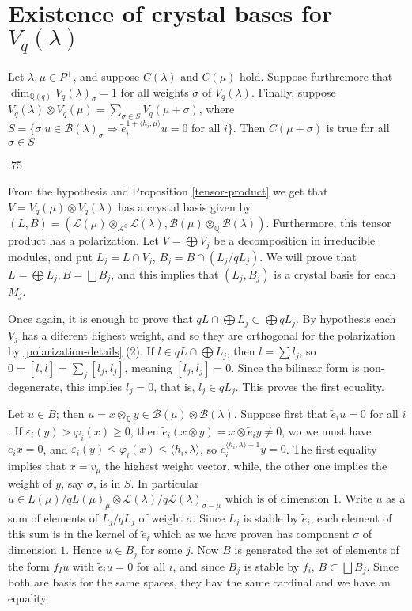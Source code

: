 \documentclass[11pt,fleqn]{article}
\makeatletter
\renewenvironment{proof}[1][\proofname]{\par
  \pushQED{\qed}%
  \normalfont \topsep.75\paraskip\relax
  \trivlist
  \item[\hskip\labelsep
        \itshape
    #1\@addpunct{.}]\ignorespaces
}{%
  \popQED\endtrivlist\@endpefalse
}
\newcommand\QQ{\mathbb Q}
\newcommand\ot{\otimes}
\renewcommand\phi{\varphi}
\newcommand\A{\mathcal A}
\newcommand\B{\mathcal B}
\renewcommand\L{\mathcal L}
\makeatother
\begin{document}
\section{Existence of crystal bases for $V_q(\lambda)$}
\begin{Lemma}
	Let $\lambda, \mu \in P^+$, and suppose $C(\lambda)$ and $C(\mu)$ hold. Suppose
furthremore that $\dim_{\QQ(q)} V_q(\lambda)_{\sigma} = 1$ for all weights $\sigma$ of
$V_q(\lambda)$. Finally, suppose $V_q(\lambda) \ot V_q(\mu) = \sum_{\sigma \in S} V_q(\mu
+ \sigma)$, where $S = \{\sigma| u \in \B(\lambda)_\sigma \Rightarrow \tilde e_i^{1+ \langle
h_i,\mu\rangle}u = 0 \mbox{ for all } i\}$. Then $C(\mu + \sigma)$ is true for all
$\sigma \in S$
\end{Lemma}
\begin{proof}
	From the hypothesis and Proposition \ref{tensor-product} we get that $V=V_q(\mu)
\ot V_q(\lambda)$ has a crystal basis given by $(L,B) = (\L(\mu) \ot_{\A^0} \L(\lambda),
\B(\mu) \ot_{\QQ} \B(\lambda))$. Furthermore, this tensor product has a polarization. Let $V =
\bigoplus V_j$ be a decomposition in irreducible modules, and put $L_j = L \cap V_j$, $B_j
= B \cap (L_j/qL_j)$. We will prove that $L = \bigoplus L_j, B = \bigsqcup B_j$, and this
implies that $(L_j,B_j)$ is a crystal basis for each $M_j$.

Once again, it is enough to prove that $q L \cap \bigoplus L_j \subset \bigoplus q L_j$. By 
hypothesis each $V_j$ has a diferent highest weight, and so they are orthogonal for the
polarization by \ref{polarization-details} (2). If $l \in qL \cap \bigoplus L_j$, then $l
= \sum l_j$, so $0 = [\overline l,\overline l] = \sum_j [\overline l_j, \overline l_j]$,
meaning $[\overline l_j,\overline l_j] = 0$. Since the bilinear form is non-degenerate,
this implies $ \overline l_j = 0$, that is, $l_j \in q L_j$. This proves the first
equality.

Let $u \in B$; then $u = x \ot_{\QQ} y \in \B(\mu) \ot \B(\lambda)$. Suppose first that
$\tilde e_i u = 0$ for all $i$. If $\varepsilon_i(y) > \phi_i(x) \geq 0$, then $\tilde e_i(
x \ot y) = x \ot \tilde e_i y \neq 0$, wo we must have $\tilde e_i x = 0$, and
$\varepsilon_i(y) \leq \phi_i(x) \leq \langle h_i,\lambda \rangle$, so $\tilde
e_i^{\langle h_i,\lambda \rangle + 1} y = 0$. The first equality implies that $x = v_\mu$
the highest weight vector, while, the other one implies the weight of $y$, say $\sigma$, 
is in $S$. In particular $u \in L(\mu)/qL(\mu)_\mu \ot \L(\lambda)/q\L(\lambda)_{\sigma - \mu}$ 
which is of dimension $1$. Write $u$ as a sum of elements of $L_j/qL_j$ of weight $\sigma$. 
Since $L_j$ is stable by $\tilde e_i$, each element of this sum is in the kernel of
$\tilde e_i$ which as we have proven has component $\sigma$ of dimension $1$. Hence $u \in
B_j$ for some $j$. Now $B$ is generated the set of elements of the form $\tilde f_I u$
with $\tilde e_i u = 0$ for all $i$, and since $B_j$ is stable by $\tilde f_i$, $B \subset
\bigsqcup B_j$. Since both are basis for the same spaces, they hav the same cardinal and
we have an equality.


\end{proof}
\end{document}
